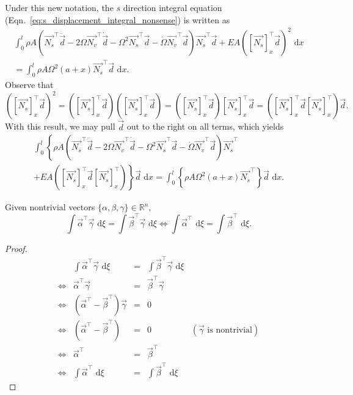 Under this new notation, the $s$ direction integral equation (Eqn.~\ref{eq:s_displacement_integral_nonsense}) is written as
\begin{eqnarray}
\int_0^l \rho A\left(\vec{N_s}^\top\ddot{\vec d}-2\Omega\vec{N_v}^\top\dot{\vec{d}}-\Omega^2\vec{N_s}^\top\vec{d}-\dot\Omega \vec{N_v}^\top\vec{d}\right)\vec{N_s}^\top\vec{d}+EA\left([\vec{N_s}]_x^\top\vec{d}\right)^2 \text{ d}x  \\
= \int_0^l \rho A\Omega^2(a+x)\vec{N_s}^\top\vec{d}\text{ d}x. \nonumber
\end{eqnarray}
Observe that
\begin{equation}
\left([\vec{N_s}]_x^\top\vec{d}\right)^2 = 
\left([\vec{N_s}]_x^\top\vec{d}\right)\left([\vec{N_s}]_x^\top\vec{d}\right) = 
\left([\vec{N_s}]_x^\top\vec{d}\right)[\vec{N_s}]_x^\top\vec{d} = 
\left([\vec{N_s}]_x^\top\vec{d}[\vec{N_s}]_x^\top\right)\vec{d}.
\label{eq:vec_prod_square}
\end{equation}
With this result, we may pull $\vec d$ out to the right on all terms, which yields
\begin{eqnarray}
\int_0^l \left\lbrace\rho A\left(\vec{N_s}^\top\ddot{\vec d}-2\Omega\vec{N_v}^\top\dot{\vec{d}}-\Omega^2\vec{N_s}^\top\vec{d}-\dot\Omega \vec{N_v}^\top\vec{d}\right)\vec{N_s}^\top\right. \\
\left.+EA\left([\vec{N_s}]_x^\top\vec{d}[\vec{N_s}]_x^\top\right) \right\rbrace\vec{d}\text{ d}x = \int_0^l \left\lbrace\rho A\Omega^2(a+x)\vec{N_s}^\top\right\rbrace\vec{d}\text{ d}x. \nonumber
\end{eqnarray}
\begin{lemma}
Given nontrivial vectors $\{\alpha,\beta,\gamma\}\in\mathbb{R}^n,$
\begin{equation}
\int\vec{\alpha}^\top\vec{\gamma}\text{ d}\xi = \int\vec{\beta}^\top\vec{\gamma}\text{ d}\xi \Leftrightarrow \int\vec{\alpha}^\top\text{ d}\xi = \int\vec{\beta}^\top\text{ d}\xi.
\end{equation}
\end{lemma}
\begin{proof}
\begin{equation}
\begin{array}{rrclr}
&\int\vec{\alpha}^\top\vec{\gamma}\text{ d}\xi &=& \int\vec{\beta}^\top\vec{\gamma}\text{ d}\xi &\\
\Leftrightarrow& \vec{\alpha}^\top\vec{\gamma} &=& \vec{\beta}^\top\vec{\gamma} &\\
\Leftrightarrow& \left(\vec{\alpha}^\top -  \vec{\beta}^\top\right)\vec{\gamma} &=& 0 &\\
\Leftrightarrow& \left(\vec{\alpha}^\top-\vec{\beta}^\top\right) &=& 0 &(\vec{\gamma}\text{ is nontrivial}) \\
\Leftrightarrow& \vec{\alpha}^\top &=& \vec{\beta}^\top &\\
\Leftrightarrow& \int\vec{\alpha}^\top\text{ d}\xi &=& \int\vec{\beta}^\top\text{ d}\xi &
\end{array}
\end{equation}
\end{proof}
